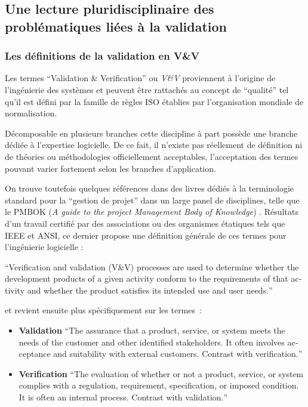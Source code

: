 

\subsection{Une lecture pluridisciplinaire des problématiques liées à la validation}
\label{ssec:triple_lecture}

\subsubsection{Les définitions de la validation en V\&V}
\label{sssec:def_generique_validation}

Les termes \foreignquote{english}{Validation \& Verification} ou \textit{V\&V} proviennent à l'origine de l'ingénierie des systèmes et peuvent être rattachés au concept de \enquote{qualité} tel qu'il est défini par la famille de règles ISO établies par l'organisation mondiale de normalisation.

Décomposable en plusieurs branches cette discipline à part possède une branche dédiée à l'expertise logicielle. De ce fait, il n'existe pas réellement de définition ni de théories ou méthodologies officiellement acceptables, l'acceptation des termes pouvant varier fortement selon les branches d'application.

On trouve toutefois quelques références dans des livres dédiés à la terminologie standard pour la \enquote{gestion de projet} dans un large panel de disciplines, telle que le PMBOK (\textit{A guide to the project Management Body of Knowledge}) \autocite{PMBOK2013}. Résultats d'un travail certifié par des associations ou des organismes étatiques tels que IEEE et ANSI, ce dernier propose une définition générale de ces termes pour l'ingénierie logicielle :

\foreignquote{english}{Verification and validation (V\&V) processes are used to determine whether the development products of a given activity conform to the requirements of that activity and whether the product satisfies its intended use and user needs.}

et revient ensuite plus spécifiquement sur les termes :

\begin{itemize}
\item \textbf{Validation} \foreignquote{english}{The assurance that a product, service, or system meets the needs of the customer and other identified stakeholders. It often involves acceptance and suitability with external customers. Contrast with verification.}
\item \textbf{Verification} \foreignquote{english}{The evaluation of whether or not a product, service, or system complies with a regulation, requirement, specification, or imposed condition. It is often an internal process. Contrast with validation.}
\end{itemize}

